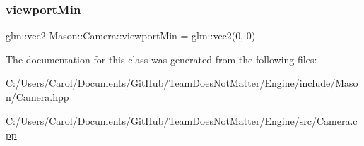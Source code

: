 \subsubsection{\texorpdfstring{viewport\+Min}{viewportMin}}
{\footnotesize\ttfamily glm\+::vec2 Mason\+::\+Camera\+::viewport\+Min = glm\+::vec2(0, 0)\hspace{0.3cm}{\ttfamily [protected]}}



The documentation for this class was generated from the following files\+:\begin{DoxyCompactItemize}
\item 
C\+:/\+Users/\+Carol/\+Documents/\+Git\+Hub/\+Team\+Does\+Not\+Matter/\+Engine/include/\+Mason/\hyperlink{_camera_8hpp}{Camera.\+hpp}\item 
C\+:/\+Users/\+Carol/\+Documents/\+Git\+Hub/\+Team\+Does\+Not\+Matter/\+Engine/src/\hyperlink{_camera_8cpp}{Camera.\+cpp}\end{DoxyCompactItemize}
